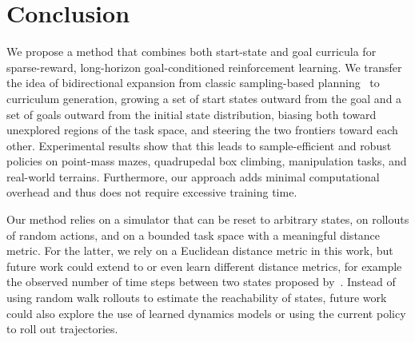 \section{Conclusion}\label{sec:conclusion}

We propose a method that combines both start-state and goal curricula for sparse-reward, long-horizon goal-conditioned reinforcement learning. We transfer the idea of bidirectional expansion from classic sampling-based planning~\citep{lavalle2001randomized, kuffner2000rrt} to curriculum generation, growing a set of start states outward from the goal and a set of goals outward from the initial state distribution, biasing both toward unexplored regions of the task space, and steering the two frontiers toward each other. Experimental results show that this leads to sample-efficient and robust policies on point-mass mazes, quadrupedal box climbing, manipulation tasks, and real-world terrains. Furthermore, our approach adds minimal computational overhead and thus does not require excessive training time.

Our method relies on a simulator that can be reset to arbitrary states, on rollouts of random actions, and on a bounded task space with a meaningful distance metric. For the latter, we rely on a Euclidean distance metric in this work, but future work could extend to or even learn different distance metrics, for example the observed number of time steps between two states proposed by~\citet{hartikainen2020dynamicaldistancelearningsemisupervised}. Instead of using random walk rollouts to estimate the reachability of states, future work could also explore the use of learned dynamics models or using the current policy to roll out trajectories.

